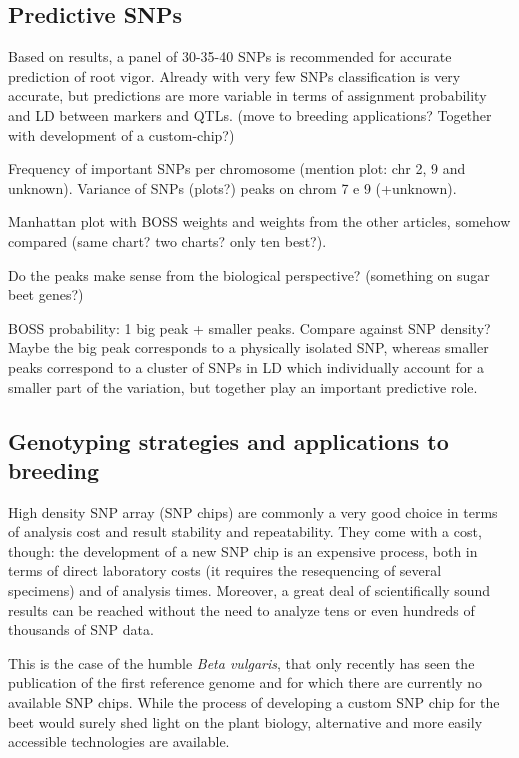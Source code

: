 \subsection{Predictive SNPs}
Based on results, a panel of 30-35-40 SNPs is recommended for accurate
prediction of root vigor. Already with very few SNPs classification is
very accurate, but predictions are more variable in terms of assignment
probability and LD between markers and QTLs. (move to breeding applications? Together with
development of a custom-chip?)

Frequency of important SNPs per chromosome (mention plot: chr 2, 9 and unknown).
Variance of SNPs (plots?) peaks on chrom 7 e 9 (+unknown).

Manhattan plot with BOSS weights and weights from the other articles,
somehow compared (same chart? two charts? only ten best?).

Do the peaks make sense from the biological perspective? (something on
sugar beet genes?)


BOSS probability: 1 big peak + smaller peaks. Compare against SNP
density? Maybe the big peak corresponds to a physically isolated SNP,
whereas smaller peaks correspond to a cluster of SNPs in LD which
individually account for a smaller part of the variation, but together
play an important predictive role. 


\subsection{Genotyping strategies and applications to breeding}
High density SNP array (SNP chips) are commonly a very good choice in
terms of analysis cost and result stability and repeatability. They come
with a cost, though: the development of a new SNP chip is an expensive
process, both in terms of direct laboratory costs (it requires the
resequencing of several specimens) and of analysis times. Moreover, a great deal
of scientifically sound results can be reached without the need to analyze
tens or even hundreds of thousands of SNP data.

This is the case of the humble \emph{Beta vulgaris}, that only recently
has seen the publication of the first reference genome \cite{dohm2013genome}
and for which there are currently no available SNP chips. While the process
of developing a custom SNP chip for the beet would surely shed light
on the plant biology, alternative and more easily accessible technologies 
are available.

